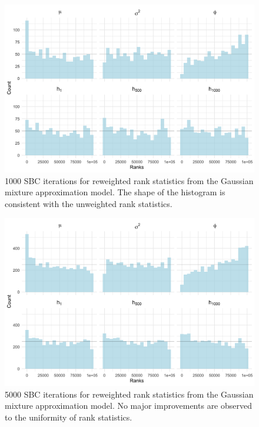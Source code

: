 \documentclass[12pt, a4paper]{article}
\begin{document}
    \begin{figure}[H]
        \centering
        \includegraphics[scale=0.1]{results/sir_cp_1k.png}
        \caption{1000 SBC iterations for reweighted rank statistics from the Gaussian mixture approximation model. The shape of the histogram is consistent with the unweighted rank statistics.}
        \label{fig:reweight1k}
    \end{figure}

    \begin{figure}[H]
        \centering
        \includegraphics[scale=0.1]{results/sir_cp_5k.png}
        \caption{5000 SBC iterations for reweighted rank statistics from the Gaussian mixture approximation model. No major improvements are observed to the uniformity of rank statistics.}
        \label{fig:reweight5k}
    \end{figure}
\end{document}
